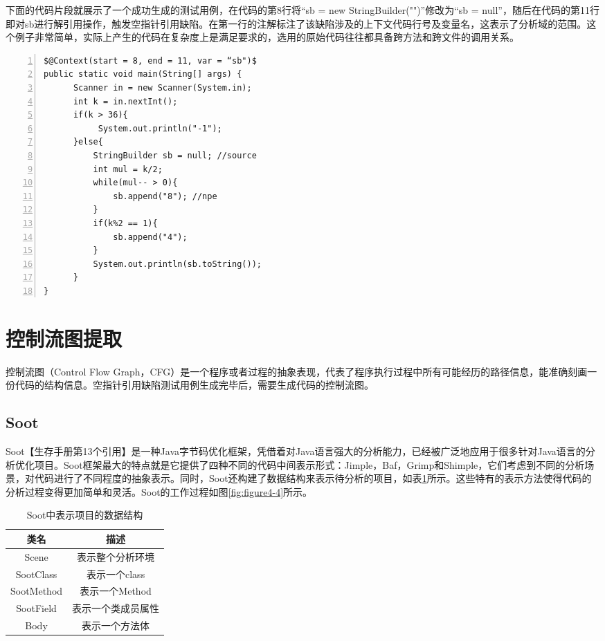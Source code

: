 下面的代码片段就展示了一个成功生成的测试用例，在代码的第8行将“sb = new StringBuilder("")”修改为“sb = null”，随后在代码的第11行即对sb进行解引用操作，触发空指针引用缺陷。在第一行的注解标注了该缺陷涉及的上下文代码行号及变量名，这表示了分析域的范围。这个例子非常简单，实际上产生的代码在复杂度上是满足要求的，选用的原始代码往往都具备跨方法和跨文件的调用关系。 

\begin{lstlisting}[language={[AspectJ]Java},numbers=left,keywordstyle=\color{blue!70},commentstyle=\color{red!50!green!50!blue!50},frame=shadowbox, rulesepcolor=\color{red!20!green!20!blue!20}] 
$@Context(start = 8, end = 11, var = “sb")$
public static void main(String[] args) {
      Scanner in = new Scanner(System.in); 
      int k = in.nextInt();
      if(k > 36){
           System.out.println("-1");
      }else{
          StringBuilder sb = null; //source                 
          int mul = k/2;
          while(mul-- > 0){
              sb.append("8"); //npe
          }
          if(k%2 == 1){
              sb.append("4");
          }
          System.out.println(sb.toString());
      }
}
\end{lstlisting}

\section{控制流图提取}
控制流图（Control Flow Graph，CFG）是一个程序或者过程的抽象表现，代表了程序执行过程中所有可能经历的路径信息，能准确刻画一份代码的结构信息。空指针引用缺陷测试用例生成完毕后，需要生成代码的控制流图。
\subsection{Soot}
Soot【生存手册第13个引用】是一种Java字节码优化框架，凭借着对Java语言强大的分析能力，已经被广泛地应用于很多针对Java语言的分析优化项目。Soot框架最大的特点就是它提供了四种不同的代码中间表示形式：Jimple，Baf，Grimp和Shimple，它们考虑到不同的分析场景，对代码进行了不同程度的抽象表示。同时，Soot还构建了数据结构来表示待分析的项目，如表\ref{tab:table4-2}所示。这些特有的表示方法使得代码的分析过程变得更加简单和灵活。Soot的工作过程如图\ref{fig:figure4-4}所示。

\begin{table}[hb]
	\centering
	\caption{Soot中表示项目的数据结构} \label{tab:table4-2}
	\begin{tabular*}{0.9\textwidth}{@{\extracolsep{\fill}}cc}
		\toprule
		类名	&描述	 \\
		\midrule
		Scene	&表示整个分析环境\\
		SootClass	&表示一个class	\\
		SootMethod	&表示一个Method	 \\
		SootField	&表示一个类成员属性	\\
		Body	&表示一个方法体 \\
		\bottomrule
	\end{tabular*}
\end{table}

